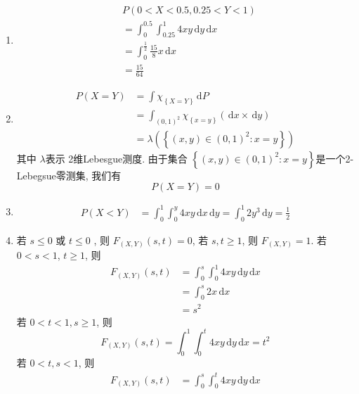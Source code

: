 \documentclass[../main.tex]{subfiles}
\begin{document}
\begin{solution}
  \begin{enumerate}
    \item  \[
    \begin{aligned}
    &P\left( 0< X< 0.5, 0.25< Y< 1 \right)\\ 
     &=  \int_{0}^{0.5}\int_{0.25}^{1}4xy\,\mathrm{d} y\,\mathrm{d} x\\ 
      &= \int_{0}^{\frac{1 }{2 } }\frac{15 }{8 }x\,\mathrm{d} x\\ 
       &= \frac{15 }{64 }    
    \end{aligned}
    \]
    \item \[
    \begin{aligned}
    P\left( X= Y \right)&= \int \chi _{\left\{ X= Y \right\}} \,\mathrm{d} P\\ 
     &=  \int _{\left( 0,1 \right)^{2} }\chi _{\left\{ x= y \right\}}\left( \,\mathrm{d} x \times \,\mathrm{d} y \right)\\ 
      &=  \lambda \left( \left\{ \left( x,y \right)\in \left( 0,1 \right)^{2}: x= y   \right\} \right)  
    \end{aligned}
    \]其中 \(   \lambda   \)表示 2维Lebesgue测度. 由于集合 \(  \left\{ \left( x,y \right)\in \left( 0,1 \right)^{2}:x= y   \right\}  \)是一个2-Lebegsue零测集, 我们有 \[
    P\left( X= Y \right) = 0
    \]  
    \item \[
    \begin{aligned}
    P\left( X< Y \right)&=  \int_{0}^{1} \int_{0}^{y}4xy \,\mathrm{d} x\,\mathrm{d} y  = \int_{0}^{1}2y^{3}\,\mathrm{d} y= \frac{1 }{2 } 
    \end{aligned}
    \]
    \item  若 \(  s\le 0 \) 或 \(  t\le 0  \) , 则 \(  F_{\left( X,Y \right) } \left( s,t \right)= 0  \), 若 \(  s,t\ge 1  \), 则 \(  F_{\left( X,Y \right) }= 1  \). 若 \(  0< s< 1  \),  \(  t\ge 1  \), 则 \[
   \begin{aligned}
    F_{\left( X,Y \right) }\left( s,t \right)&=  \int_{0}^{s}\int_{0}^{1}4xy \,\mathrm{d} y\,\mathrm{d} x\\ 
     &=  \int_{0}^{s}2x\,\mathrm{d} x\\ 
      &= s^{2}
   \end{aligned} 
    \]若 \(  0< t< 1, s\ge 1  \), 则 \[
    F_{\left( X,Y \right) }\left( s,t \right)= \int_{0}^{1}\int_{0}^{t}4xy\,\mathrm{d} y\,\mathrm{d} x= t^{2} 
    \]  若 \(  0< t,s< 1  \), 则        \[
    \begin{aligned}
    F_{\left( X,Y \right) }\left( s,t \right)&= \int_{0}^{s}\int_{0}^{t}4xy \,\mathrm{d} y\,\mathrm{d} x\\ 

\end{aligned}\]
\end{enumerate}
\end{solution}
\end{document}
